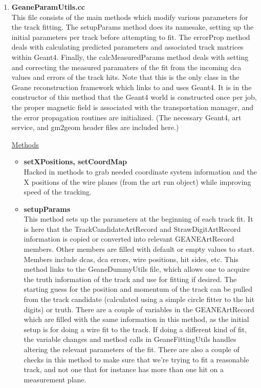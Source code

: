 \begin{enumerate}
\begin{itemize}
        \end{itemize}

      \item{\bf{GeaneParamUtils.cc}} \\
      \label{sec:GeaneParamUtils}
      This file consists of the main methods which modify various parameters for the track fitting. The setupParams method does its namesake, setting up the initial parameters per track before attempting to fit. The errorProp method deals with calculating predicted parameters and associated track matrices within Geant4. Finally, the calcMeasuredParams method deals with setting and correcting the measured paramaters of the fit from the incoming dca values and errors of the track hits. Note that this is the only class in the Geane reconstruction framework which links to and uses Geant4. It is in the constructor of this method that the Geant4 world is constructed once per job, the proper magnetic field is associated with the transportation manager, and the error propagation routines are initialized. (The necessary Geant4, art service, and gm2geom header files are included here.)

      \underline{Methods}

        \begin{itemize}

          \item{\bf{setXPositions, setCoordMap}} \\
          Hacked in methods to grab needed coordinate system information and the X positions of the wire planes (from the art run object) while improving speed of the tracking.

          \item{\bf{setupParams}} \\
          This method sets up the parameters at the beginning of each track fit. It is here that the TrackCandidateArtRecord and StrawDigitArtRecord information is copied or converted into relevant GEANEArtRecord members. Other members are filled with default or empty values to start. Members include dcas, dca errors, wire positions, hit sides, etc. This method links to the GeaneDummyUtils file, which allows one to acquire the truth information of the track and use for fitting if desired. The starting guess for the position and momentum of the track can be pulled from the track candidate (calculated using a simple circle fitter to the hit digits) or truth. There are a couple of variables in the GEANEArtRecord which are filled with the same information in this method, as the initial setup is for doing a wire fit to the track. If doing a different kind of fit, the variable changes and method calls in GeaneFittingUtils handles altering the relevant parameters of the fit. There are also a couple of checks in this method to make sure that we're trying to fit a reasonable track, and not one that for instance has more than one hit on a measurement plane.


\end{itemize}
\end{enumerate}
